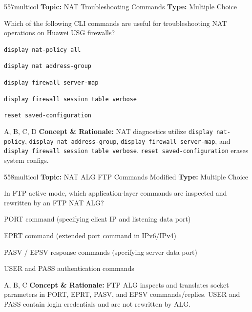 \begin{qcard}{557}{multicol}
\textcolor{darkslate!75}{\small\textbf{Topic:} NAT Troubleshooting Commands \hfill \textbf{Type:} Multiple Choice}\vspace{0.4em}\par
Which of the following CLI commands are useful for troubleshooting NAT operations on Huawei USG firewalls?
\begin{qoptions}
\item \texttt{display nat-policy all}
\item \texttt{display nat address-group}
\item \texttt{display firewall server-map}
\item \texttt{display firewall session table verbose}
\item \texttt{reset saved-configuration}
\end{qoptions}
\end{qcard}
\nopagebreak
\begin{explainbox}{A, B, C, D}
\textbf{Concept \& Rationale:} NAT diagnostics utilize \texttt{display nat-policy}, \texttt{display nat address-group}, \texttt{display firewall server-map}, and \texttt{display firewall session table verbose}. \texttt{reset saved-configuration} erases system configs.
\end{explainbox}

\begin{qcard}{558}{multicol}
\textcolor{darkslate!75}{\small\textbf{Topic:} NAT ALG FTP Commands Modified \hfill \textbf{Type:} Multiple Choice}\vspace{0.4em}\par
In FTP active mode, which application-layer commands are inspected and rewritten by an FTP NAT ALG?
\begin{qoptions}
\item PORT command (specifying client IP and listening data port)
\item EPRT command (extended port command in IPv6/IPv4)
\item PASV / EPSV response commands (specifying server data port)
\item USER and PASS authentication commands
\end{qoptions}
\end{qcard}
\nopagebreak
\begin{explainbox}{A, B, C}
\textbf{Concept \& Rationale:} FTP ALG inspects and translates socket parameters in PORT, EPRT, PASV, and EPSV commands/replies. USER and PASS contain login credentials and are not rewritten by ALG.
\end{explainbox}

